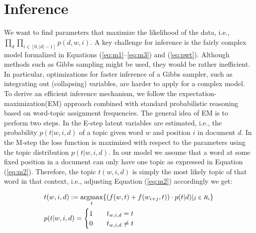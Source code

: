 \documentclass[twocolumn,10]{article}
\DeclareMathOperator*{\argmax}{\arg\!\max}
\begin{document}
	\section{Inference} \label{sec:inf}
	We want to find parameters that maximize the likelihood of the data, i.e.,  $\prod_d \prod_{i \in [0,|d|-1]} p(d,w,i)$. A key challenge for inference is the fairly complex model formalized in Equations (\ref{eq:m1}--\ref{eq:m3}) and (\ref{eq:pwt}). Although methods such as Gibbs sampling might be used, they would be rather inefficient. In particular, optimizations for faster inference of a Gibbs sampler, such as integrating out (collapsing) variables, are harder to apply for a complex model. To derive an efficient inference mechanism, we follow the expectation-maximization(EM) approach combined with standard probabilistic reasoning based on word-topic assignment frequencies. The general idea of EM is to perform two steps. In the E-step latent variables are estimated, i.e., the probability $p(t|w,i,d)$ of a topic given word $w$ and position $i$ in document $d$. In the M-step the loss function is maximized with respect to the parameters using the topic distribution $p(t|w,i,d)$. 
	In our model we assume that a word at some fixed position in a document can only have one topic as expressed in Equation (\ref{eq:m2}). Therefore, the topic $t(w,i,d)$ is simply the most likely topic of that word in that context, i.e., adjusting Equation (\ref{eq:m2}) accordingly we get:
			\vspace{-11pt}					
	\begin{small}

		\begin{equation} \begin{aligned}		
		&t(w,i,d) := \argmax_{t} \{(f(w,t)+f(w_{i+j},t))\cdot p(t|d)| \footnotesize{\text{$j \in R_i$}}\} \\
		\vspace{-3pt} 			
		&p(t|w,i,d) = \begin{cases}  \label{eq:siass}
		1  \qquad t_{w,i,d}=t\\
		0 \qquad t_{w,i,d}\neq t\\
		\end{cases}				
		\end{aligned}   \end{equation}
	\end{small}	
		\vspace{-12pt} 
			
\end{document}
